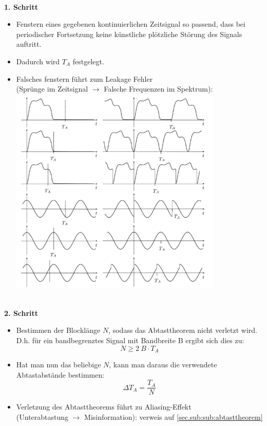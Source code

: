 \documentclass[12pt,a4paper]{scrartcl}
\begin{document}
 \noindent \\ \textbf{1. Schritt}
 \begin{itemize}
 \item Fenstern eines gegebenen kontinuierlichen Zeitsignal so passend, dass bei periodischer Fortsetzung keine künstliche plötzliche Störung des Signals auftritt.
 \item Dadurch wird $T_A$ festgelegt.
 \item Falsches fenstern führt zum Leakage Fehler \\(Sprünge im Zeitsignal $\to$ Falsche Frequenzen im Spektrum): \\\includegraphics[height=10cm]{Pictures/BSPSchritt1.png} 
 \end{itemize}

 \noindent \\ \textbf{2. Schritt}
 \begin{itemize}
  \item Bestimmen der Blocklänge $N$, sodass das Abtasttheorem nicht verletzt wird. D.h. für ein bandbegrenztes Signal mit Bandbreite B ergibt sich dies zu: $$N \geq 2\ B\cdot T_A$$
  \item Hat man nun das beliebige $N$, kann man daraus die verwendete Abtastabstände bestimmen: $$ \Delta T_A = \frac{T_A}{N}$$
  \item Verletzung des Abtasttheorems führt zu Aliasing-Effekt \\(Unterabtastung $\to$ Misinformation): verweis auf \ref{sec.sub:sub:abtasttheorem} \\
 \end{itemize}
\end{document}
